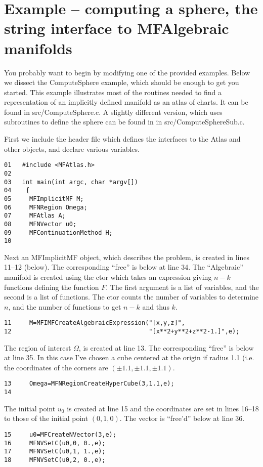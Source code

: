 \documentclass[12pt]{article}
\begin{document}
\section{Example -- computing a sphere, the string interface to MFAlgebraic manifolds}

You probably want to begin by modifying one of the provided examples. Below we dissect the ComputeSphere example, 
which should be enough to get you started.
This example illustrates most of the routines needed to find a representation of an implicitly defined
manifold as an atlas of charts. It can be found in src/ComputeSphere.c. A slightly different version,
which uses subroutines to define the sphere can be found in in src/ComputeSphereSub.c.

First we include the header file which defines the interfaces to the Atlas and other objects,
and declare various variables.
\begin{verbatim}
01   #include <MFAtlas.h>
02   
03   int main(int argc, char *argv[])
04    {
05     MFImplicitMF M;
06     MFNRegion Omega;
07     MFAtlas A;
08     MFNVector u0;
09     MFContinuationMethod H;
10     
\end{verbatim}
Next an {MFImplicitMF} object, which describes the problem, is created in lines
11--12 (below). The corresponding ``free'' is below at line 34. The ``Algebraic'' manifold is
created using the ctor which takes an expression giving $n-k$ functions
defining the function $F$. The first argument is a list of variables, and
the second is a list of functions. The ctor counts the number of variables 
to determine $n$, and the number of functions to get $n-k$ and thus $k$.
\begin{verbatim}
11     M=MFIMFCreateAlgebraicExpression("[x,y,z]",
12                                      "[x**2+y**2+z**2-1.]",e);
\end{verbatim}
The region of interest $\Omega$, is created at line 13. The corresponding ``free'' is below at
line 35. In this case I've chosen a cube centered at the origin if radius 1.1 (i.e. the
coordinates of the corners are $(\pm1.1,\pm1.1,\pm1.1)$. 
\begin{verbatim}
13     Omega=MFNRegionCreateHyperCube(3,1.1,e);
14   
\end{verbatim}
The initial point $u_0$ is created at line 15 and the coordinates are set
in lines 16--18 to those of the initial point $(0,1,0)$. The vector is
``free'd'' below at line 36.
\begin{verbatim}
15     u0=MFCreateNVector(3,e);
16     MFNVSetC(u0,0, 0.,e);
17     MFNVSetC(u0,1, 1.,e);
18     MFNVSetC(u0,2, 0.,e);
\end{verbatim}
\end{document}
